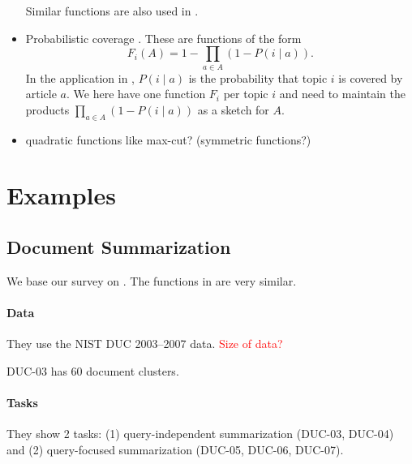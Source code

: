 \documentclass{article}
\newcommand{\red}[1]{\textcolor{red}{#1}}
\begin{document}
\begin{itemize}
\begin{enumerate}
  \end{enumerate}
  Similar functions are also used in \citep{linB11,liu13}.
 \item Probabilistic coverage \citep{yue11}. These are functions of the form
    \begin{equation}
      \label{eq:4}
      F_i(A) = 1 - \prod_{a \in A}(1-P(i\mid a)).
    \end{equation}
    In the application in \citep{yue11}, $P(i \mid a)$ is the probability that topic $i$ is covered by article $a$. We here have one function $F_i$ per topic $i$ and need to maintain the products $\prod_{a \in A}(1-P(i\mid a))$ as a sketch for $A$.
\item quadratic functions like max-cut? (symmetric functions?)
\end{itemize}


\section{Examples}
\subsection{Document Summarization}

We base our survey on \citep{linB12learning}. The functions in \citep{linB11} are very similar.

\paragraph{Data} They use the NIST DUC 2003--2007 data. \red{Size of data?}

DUC-03 has 60 document clusters.


\paragraph{Tasks} They show 2 tasks: (1) query-independent summarization (DUC-03, DUC-04) and (2) query-focused summarization (DUC-05, DUC-06, DUC-07). 
\end{document}
